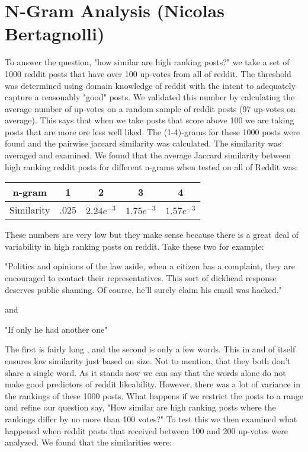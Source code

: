 \documentclass[12pt]{article}
\numberwithin{equation}{section}
\begin{document}
		
\section*{N-Gram Analysis (Nicolas Bertagnolli)}
	To answer the question, "how similar are high ranking posts?" we take a set of 1000 reddit posts that have over 100 up-votes from all of reddit.  The threshold was determined using domain knowledge of reddit with the intent to adequately capture a reasonably "good" posts.   We validated this number by calculating the average number of up-votes on a random sample of reddit posts (97 up-votes on average).  This says that when we take posts that score above 100 we are taking posts that are more ore less well liked.   The (1-4)-grams for these 1000 posts were found and the pairwise jaccard similarity was calculated.  The similarity was averaged and examined.  We found that the average Jaccard similarity between high ranking reddit posts for different n-grams when tested on all of Reddit was:\newline
	\begin{table}[h!]
	  \begin{tabular}{c | c c c c}
	  n-gram & 1 & 2 & 3 & 4\\
	  \hline
	  Similarity & .025 & $2.24e^{-3}$ & $1.75e^{-3}$ & $1.57e^{-3}$
	  \end{tabular}
	\end{table}
	
	These numbers are very low but they make sense because there is a great deal of variability in high ranking posts on reddit.  Take these two for example:\newline
	
	"Politics and opinions of the law aside, when a citizen has a complaint, they are encouraged to contact their representatives.  This sort of dickhead response deserves public shaming. Of course, he'll surely claim his email was hacked."\newline
	
	and \newline
	
	"If only he had another one"
	
	The first is fairly long , and the second is only a few words.  This in and of itself ensures low similarity just based on size.  Not to mention, that they both don't share a single word.  As it stands now we can say that the words alone do not make good predictors of reddit likeability.  However, there was a lot of variance in the rankings of these 1000 posts.  What happens if we restrict the posts to a range and refine our question say, "How similar are high ranking posts where the rankings differ by no more than 100 votes?" To test this we then examined what happened when reddit posts that received between 100 and 200 up-votes were analyzed.  We found that the similarities were:\newline
	
\end{document}
